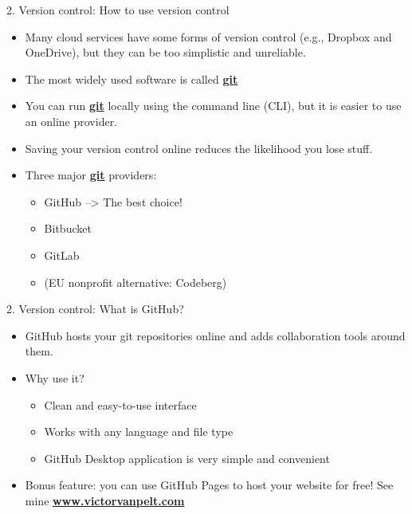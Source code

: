 \documentclass[
  ignorenonframetext,
  aspectratio=169,
]{beamer}
\providecommand{\tightlist}{%
  \setlength{\itemsep}{0pt}\setlength{\parskip}{0pt}}
\begin{document}
\begin{frame}{2. Version control: How to use version control}
\label{version-control-how-to-use-version-control}
\begin{itemize}
\tightlist
\item
  Many cloud services have some forms of version control (e.g., Dropbox
  and OneDrive), but they can be too simplistic and unreliable.
\item
  The most widely used software is called
  \href{https://git-scm.com/}{\textbf{git}}
\item
  You can run \href{https://git-scm.com/}{\textbf{git}} locally using
  the command line (CLI), but it is easier to use an online provider.
\item
  Saving your version control online reduces the likelihood you lose
  stuff.
\item
  Three major \href{https://git-scm.com/}{\textbf{git}} providers:

  \begin{itemize}
  \tightlist
  \item
    GitHub --\textgreater{} The best choice!
  \item
    Bitbucket
  \item
    GitLab
  \item
    (EU nonprofit alternative: Codeberg)
  \end{itemize}
\end{itemize}
\end{frame}

\begin{frame}{2. Version control: What is GitHub?}
\label{version-control-what-is-github}
\begin{itemize}
\tightlist
\item
  GitHub hosts your git repositories online and adds collaboration tools
  around them.
\item
  Why use it?

  \begin{itemize}
  \tightlist
  \item
    Clean and easy-to-use interface
  \item
    Works with any language and file type
  \item
    GitHub Desktop application is very simple and convenient
  \end{itemize}
\item
  Bonus feature: you can use GitHub Pages to host your website for free!
  See mine
  \href{https://www.victorvanpelt.com}{\textbf{www.victorvanpelt.com}}
\end{itemize}
\end{frame}
\end{document}
